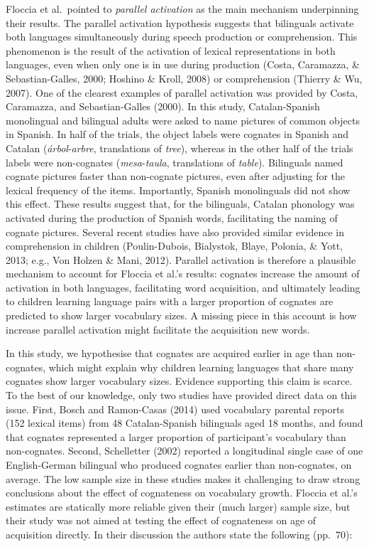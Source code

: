 \documentclass[
  english,
  man,man,floatsintext]{apa6}
\begin{document}
Floccia et al.~pointed to \emph{parallel activation} as the main mechanism underpinning their results. The parallel activation hypothesis suggests that bilinguals activate both languages simultaneously during speech production or comprehension. This phenomenon is the result of the activation of lexical representations in both languages, even when only one is in use during production (Costa, Caramazza, \& Sebastian-Galles, 2000; Hoshino \& Kroll, 2008) or comprehension (Thierry \& Wu, 2007). One of the clearest examples of parallel activation was provided by Costa, Caramazza, and Sebastian-Galles (2000). In this study, Catalan-Spanish monolingual and bilingual adults were asked to name pictures of common objects in Spanish. In half of the trials, the object labels were cognates in Spanish and Catalan (\emph{árbol}-\emph{arbre}, translations of \emph{tree}), whereas in the other half of the trials labels were non-cognates (\emph{mesa}-\emph{taula}, translations of \emph{table}). Bilinguals named cognate pictures faster than non-cognate pictures, even after adjusting for the lexical frequency of the items. Importantly, Spanish monolinguals did not show this effect. These results suggest that, for the bilinguals, Catalan phonology was activated during the production of Spanish words, facilitating the naming of cognate pictures. Several recent studies have also provided similar evidence in comprehension in children (Poulin-Dubois, Bialystok, Blaye, Polonia, \& Yott, 2013; e.g., Von Holzen \& Mani, 2012). Parallel activation is therefore a plausible mechanism to account for Floccia et al.'s results: cognates increase the amount of activation in both languages, facilitating word acquisition, and ultimately leading to children learning language pairs with a larger proportion of cognates are predicted to show larger vocabulary sizes. A missing piece in this account is how increase parallel activation might facilitate the acquisition new words.

In this study, we hypothesise that cognates are acquired earlier in age than non-cognates, which might explain why children learning languages that share many cognates show larger vocabulary sizes. Evidence supporting this claim is scarce. To the best of our knowledge, only two studies have provided direct data on this issue. First, Bosch and Ramon-Casas (2014) used vocabulary parental reports (152 lexical items) from 48 Catalan-Spanish bilinguals aged 18 months, and found that cognates represented a larger proportion of participant's vocabulary than non-cognates. Second, Schelletter (2002) reported a longitudinal single case of one English-German bilingual who produced cognates earlier than non-cognates, on average. The low sample size in these studies makes it challenging to draw strong conclusions about the effect of cognateness on vocabulary growth. Floccia et al.'s estimates are statically more reliable given their (much larger) sample size, but their study was not aimed at testing the effect of cognateness on age of acquisition directly. In their discussion the authors state the following (pp.~70):
\end{document}
